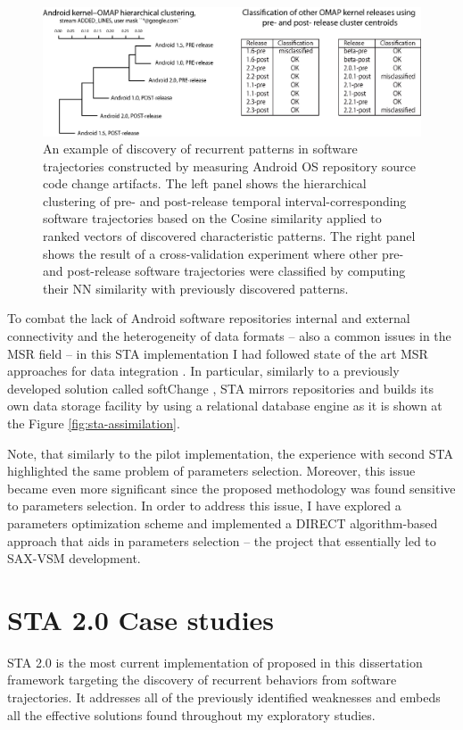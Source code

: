 \begin{figure}[t]
   \centering
   \includegraphics[width=145mm]{figures/STA2.eps}
   \caption{An example of discovery of recurrent patterns in software trajectories constructed by measuring Android OS 
   repository source code change artifacts.
   The left panel shows the hierarchical clustering of pre- and post-release temporal interval-corresponding software 
   trajectories based on the Cosine similarity applied to ranked vectors of discovered characteristic patterns.
   The right panel shows the result of a cross-validation experiment where other pre- and post-release software trajectories 
   were classified by computing their NN similarity with previously discovered patterns.}
   \label{fig:STA2-results}
\end{figure}

To combat the lack of Android software repositories internal and external connectivity and the heterogeneity of data formats -- also a common issues in the MSR field -- in this STA implementation I had followed state of the art MSR approaches for data integration \cite{citeulike:13058334} \cite{cvsanaly}. In particular, similarly to a previously developed solution called softChange \cite{german04_softchange}, STA mirrors repositories and builds its own data storage facility by using a relational database engine as it is shown at the Figure \ref{fig:sta-assimilation}.

Note, that similarly to the pilot implementation, the experience with second STA highlighted the same problem of parameters selection. Moreover, this issue became even more significant since the proposed methodology was found sensitive to parameters selection. In order to address this issue, I have explored a parameters optimization scheme and implemented a DIRECT algorithm-based approach \cite{citeulike:12563460} that aids in parameters selection -- the project that essentially led to SAX-VSM development.

\section{STA 2.0 Case studies}
STA 2.0 is the most current implementation of proposed in this dissertation framework targeting the discovery of recurrent behaviors from software trajectories. It addresses all of the previously identified weaknesses and embeds all the effective solutions found throughout my exploratory studies. 

